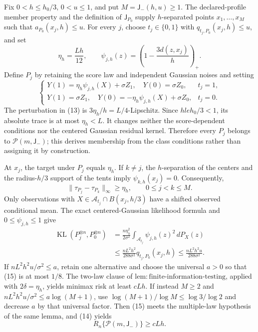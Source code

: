 Fix \(0<h\le h_0/3\), \(0<u\le1\), and put \(M=\mathsf J_{-}(h,u)\ge1\).  The declared-profile member property and the definition of \(\mathsf J_{P_0}\) supply \(h\)-separated points \(x_1,\ldots,x_M\) such that \(a_{P_0}(x_j,h)\le u\).  For every \(j\), choose \(t_j\in\{0,1\}\) with \(q_{t_j,P_0}(x_j,h)\le u\), and set
\[
 \eta_h=\frac{Lh}{12},
 \qquad
 \psi_{j,h}(z)=\left(1-\frac{3d(z,x_j)}h\right)_+. \tag{12}
\]
Define \(P_j\) by retaining the score law and independent Gaussian noises and setting
\[
 \begin{cases}
 Y(1)=\eta_h\psi_{j,h}(X)+\sigma Z_1,\quad Y(0)=\sigma Z_0,&t_j=1,\\
 Y(1)=\sigma Z_1,\quad Y(0)=-\eta_h\psi_{j,h}(X)+\sigma Z_0,&t_j=0.
 \end{cases} \tag{13}
\]
The perturbation in (13) is \(3\eta_h/h=L/4\)-Lipschitz.  Since \(hle h_0/3<1\), its absolute trace is at most \(\eta_h<L\).  It changes neither the score-dependent conditions nor the centered Gaussian residual kernel.  Therefore every \(P_j\) belongs to \(\mathcal P(m,\mathsf J_{-})\); this derives membership from the class conditions rather than assigning it by construction.

At \(x_j\), the target under \(P_j\) equals \(\eta_h\).  If \(k\ne j\), the \(h\)-separation of the centers and the radius-\(h/3\) support of the tents imply \(\psi_{k,h}(x_j)=0\).  Consequently,
\[
 \|\tau_{P_j}-\tau_{P_k}\|_\infty\ge\eta_h,
 \qquad 0\le j<k\le M. \tag{14}
\]
Only observations with \(X\in\mathcal A_{t_j}\cap B(x_j,h/3)\) have a shifted observed conditional mean.  The exact centered-Gaussian likelihood formula and \(0\le\psi_{j,h}\le1\) give
\[
 \begin{aligned}
 \operatorname{KL}(P_j^{\otimes n},P_0^{\otimes n})
 &=\frac{n\eta_h^2}{2\sigma^2}
   \int_{\mathcal A_{t_j}}\psi_{j,h}(z)^2\,dP_X(z)\\
 &\le\frac{nL^2h^2}{288\sigma^2}
   q_{t_j,P_0}(x_j,h)
 \le\frac{nL^2h^2u}{288\sigma^2}.
 \end{aligned} \tag{15}
\]
If \(nL^2h^2u/\sigma^2\le a\), retain one alternative and choose the universal \(a>0\) so that (15) is at most \(1/8\).  The two-law clause of \(\mathrm{lem:finite\text{-}information\text{-}testing}\), applied with \(2\delta=\eta_h\), yields minimax risk at least \(cLh\).  If instead \(M\ge2\) and \(nL^2h^2u/\sigma^2\le a\log(M+1)\), use \(\log(M+1)/\log M\le\log3/\log2\) and decrease \(a\) by that universal factor.  Then (15) meets the multiple-law hypothesis of the same lemma, and (14) yields
\[
 R_n\{\mathcal P(m,\mathsf J_{-})\}\ge cLh. \tag{16}
\]

